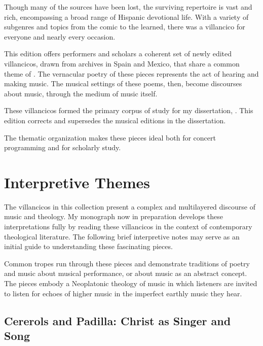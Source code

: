 Though many of the sources have been lost, the surviving repertoire is vast and 
rich, encompassing a broad range of Hispanic devotional life.
With a variety of subgenres and topics from the comic to the learned, there was 
a villancico for everyone and nearly every occasion.

This edition offers performers and scholars a coherent set of newly edited 
villancicos, drawn from archives in Spain and Mexico, that share a common theme 
of .
The vernacular poetry of these  pieces represents the act 
of hearing and making music.
The musical settings of these poems, then, become discourses about music, 
through the medium of music itself.%
  \begin{Footnote}
      These villancicos formed the primary corpus of study for my dissertation, 
      \citemydiss.
      This edition corrects and supersedes the musical editions in the dissertation.
  \end{Footnote}
The thematic organization makes these pieces ideal both for concert programming 
and for scholarly study.

\section{Interpretive Themes}

The villancicos in this collection present a complex and multilayered discourse 
of music and theology.
My monograph now in preparation develops these interpretations fully by reading 
these villancicos in the context of contemporary theological literature.
The following brief interpretive notes may serve as an initial guide to 
understanding these fascinating pieces.

Common tropes run through these pieces and demonstrate traditions of poetry and 
music about musical performance, or about music as an abstract concept.
The pieces embody a Neoplatonic theology of music in which listeners are 
invited to listen for echoes of higher music in the imperfect earthly music 
they hear.


\subsection{Cererols and Padilla: Christ as Singer and Song}

